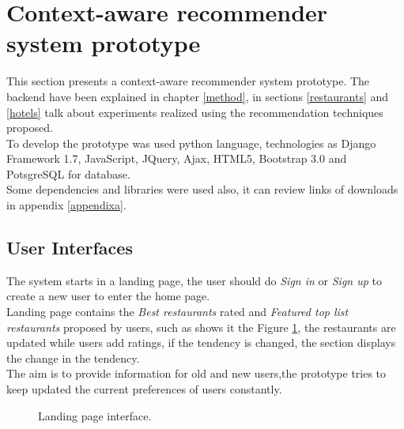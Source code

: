 \section{Context-aware recommender system prototype} 

This section presents a context-aware recommender system prototype.
The backend have been explained in chapter  \ref{method},  in sections
 \ref{restaurants} and  \ref{hotels} talk about experiments realized
using the recommendation techniques proposed. \\ To develop the prototype
was used python language, technologies as Django Framework 1.7,
JavaScript, JQuery, Ajax, HTML5, Bootstrap 3.0  and PotsgreSQL for database.\\ 
Some dependencies and libraries were used also, it can review links of
downloads in appendix  \ref{appendixa}.

\subsection{User Interfaces}

The system starts in a landing page, the user should do \textit{Sign in} or
\textit{Sign up} to create a new user to enter the home page. \\ 
Landing page contains the \textit{Best restaurants} rated and 
\textit{Featured top list restaurants}
proposed by users, such as shows it the Figure  \ref{fig:landing}, 
the restaurants are updated while users add ratings, 
if the tendency is changed, the section displays the change 
in the tendency. \\ The aim is to provide
information for old and new users,the prototype tries to keep updated
the current preferences of users constantly.
\begin{figure}
\captionsetup{font=footnotesize}
\centering
{}
\caption{Landing page interface.}
\label{fig:landing}   
\end{figure}

